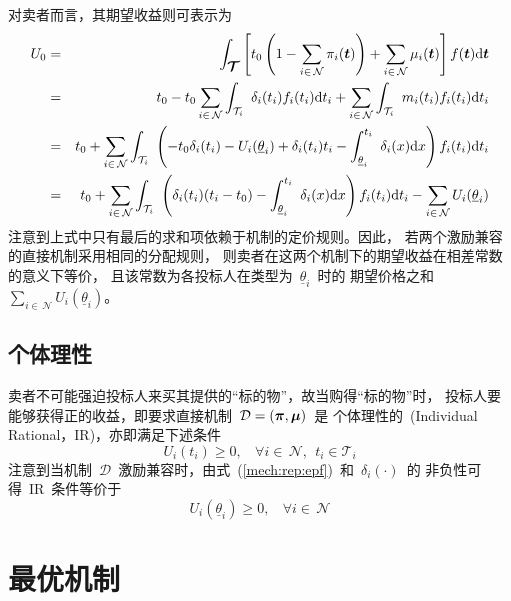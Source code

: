 \documentclass[a4paper,12pt]{article}
\newcommand{\mv}[1]{\mbox{\boldmath$#1$}}         %
\newcommand{\id}{\mathrm{d}}                      %
\begin{document}
对卖者而言，其期望收益则可表示为
\begin{eqnarray*}
  U_0 &=& \int_{\mv{\mathcal{T}}}\left[t_0\left(1-\sum_{i\in\,\mathcal{N}}\pi_i(\mv{t})\right)
       +  \sum_{i\in\,\mathcal{N}}\mu_i(\mv{t})\right]f(\mv{t})\id\mv{t} \\
      &=& t_0-t_0\sum_{i\in\,\mathcal{N}}\int_{\mathcal{T}_i}~\delta_i(t_i)f_i(t_i)\id t_i
       +  \sum_{i\in\,\mathcal{N}}\int_{\mathcal{T}_i}~m_i(t_i)f_i(t_i)\id t_i\\
      &=& t_0+\sum_{i\in\,\mathcal{N}}\int_{\mathcal{T}_i}~\left(-t_0\delta_i(t_i)
          -U_i(\underline{\theta}_i) + \delta_i(t_i)t_i -
          \int_{\underline{\theta}_i}^{t_i}~\delta_i(x)\id x\right)f_i(t_i)\id t_i\\
      &=& t_0 + \sum_{i\in\,\mathcal{N}}\int_{\mathcal{T}_i}~
          \left(\delta_i(t_i)(t_i-t_0) - \int_{\underline{\theta}_i}^{t_i}~\delta_i(x)\id x\right)f_i(t_i)\id t_i
       - \sum_{i\in\,\mathcal{N}}U_i(\underline{\theta}_i)
\end{eqnarray*}
注意到上式中只有最后的求和项依赖于机制的定价规则。因此，
若两个激励兼容的直接机制采用相同的分配规则，
则卖者在这两个机制下的期望收益在相差常数的意义下等价，
且该常数为各投标人在类型为~$\underline{\theta}_i$~时的
期望价格之和~$\sum_{i\in\,\mathcal{N}}U_i(\underline{\theta}_i)$。



\subsection{个体理性}

卖者不可能强迫投标人来买其提供的``标的物''，故当购得``标的物''时，
投标人要能够获得正的收益，即要求直接机制~$\mathcal{D}=(\mv{\pi},\mv{\mu})$~是
个体理性的~(Individual Rational，IR)，亦即满足下述条件
\begin{equation}\label{mech:IR:definition}
    U_i(t_i) \ge 0,~~~~\forall i\in\,\mathcal{N},~~t_i\in\mathcal{T}_i
\end{equation}
注意到当机制~$\mathcal{D}$~激励兼容时，由式~(\ref{mech:rep:epf})~和~$\delta_i(\cdot)$~的
非负性可得~IR~条件等价于
\begin{equation*}
    U_i(\underline{\theta}_i) \ge 0,~~~~\forall i\in\,\mathcal{N}
\end{equation*}



\section{最优机制}
\end{document}
